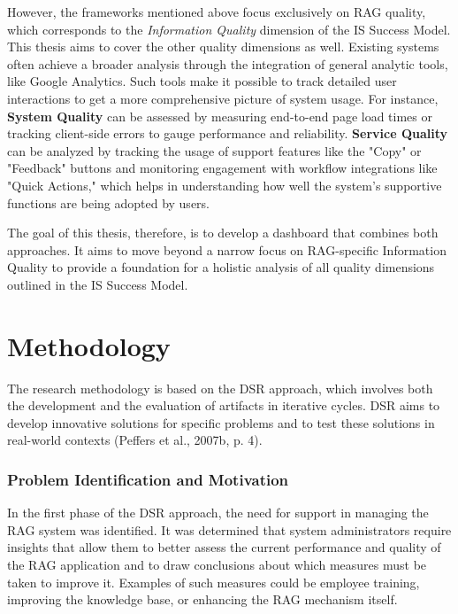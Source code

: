 \documentclass[
	english,
	ruledheaders=section,%
	class=report,%
	thesis={type=bachelor},%
	accentcolor=1b,%
	custommargins=true,%
	marginpar=false,%
	parskip=half-,%
	fontsize=11pt,%
	DIV=14,
]{tudapub}
\begin{document}
However, the frameworks mentioned above focus exclusively on RAG quality, which corresponds to the \textit{Information Quality} dimension of the IS Success Model. This thesis aims to cover the other quality dimensions as well. Existing systems often achieve a broader analysis through the integration of general analytic tools, like Google Analytics. Such tools make it possible to track detailed user interactions to get a more comprehensive picture of system usage. For instance, \textbf{System Quality} can be assessed by measuring end-to-end page load times or tracking client-side errors to gauge performance and reliability. \textbf{Service Quality} can be analyzed by tracking the usage of support features like the "Copy" or "Feedback" buttons and monitoring engagement with workflow integrations like "Quick Actions," which helps in understanding how well the system's supportive functions are being adopted by users.

The goal of this thesis, therefore, is to develop a dashboard that combines both approaches. It aims to move beyond a narrow focus on RAG-specific Information Quality to provide a foundation for a holistic analysis of all quality dimensions outlined in the IS Success Model.
\chapter{Methodology}
The research methodology is based on the DSR approach, which involves both the development and the evaluation of artifacts in iterative cycles. DSR aims to develop innovative solutions for specific problems and to test these solutions in real-world contexts (Peffers et al., 2007b, p. 4).\\
\subsection{Problem Identification and Motivation}
In the first phase of the DSR approach, the need for support in managing the RAG system was identified. It was determined that system administrators require insights that allow them to better assess the current performance and quality of the RAG application and to draw conclusions about which measures must be taken to improve it. Examples of such measures could be employee training, improving the knowledge base, or enhancing the RAG mechanism itself.
\end{document}
